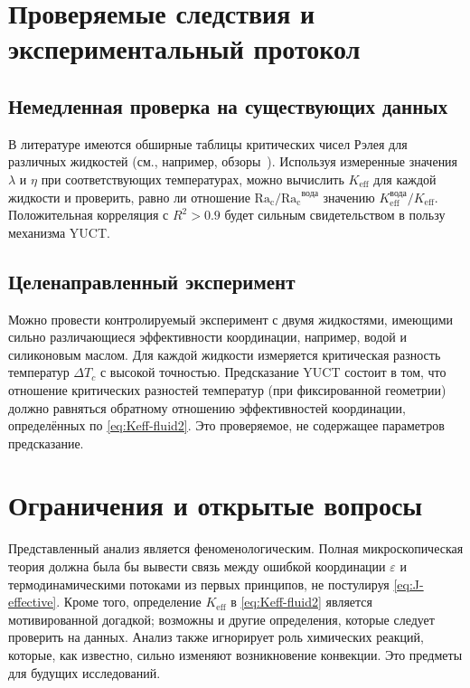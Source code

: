 \documentclass[12pt,a4paper]{article}
\begin{document}
	\section{Проверяемые следствия и экспериментальный протокол}
	
	\subsection{Немедленная проверка на существующих данных}
	В литературе имеются обширные таблицы критических чисел Рэлея для различных жидкостей (см., например, обзоры~\cite{Chandrasekhar1961, Cross1993}). Используя измеренные значения \(\lambda\) и \(\eta\) при соответствующих температурах, можно вычислить \(K_{\mathrm{eff}}\) для каждой жидкости и проверить, равно ли отношение \(\mathrm{Ra_c}/\mathrm{Ra_c}^{\text{вода}}\) значению \(K_{\mathrm{eff}}^{\text{вода}} / K_{\mathrm{eff}}\). Положительная корреляция с \(R^2 > 0.9\) будет сильным свидетельством в пользу механизма YUCT.
	
	\subsection{Целенаправленный эксперимент}
	Можно провести контролируемый эксперимент с двумя жидкостями, имеющими сильно различающиеся эффективности координации, например, водой и силиконовым маслом. Для каждой жидкости измеряется критическая разность температур \(\Delta T_c\) с высокой точностью. Предсказание YUCT состоит в том, что отношение критических разностей температур (при фиксированной геометрии) должно равняться обратному отношению эффективностей координации, определённых по \eqref{eq:Keff-fluid2}. Это проверяемое, не содержащее параметров предсказание.
	
	\section{Ограничения и открытые вопросы}
	
	Представленный анализ является феноменологическим. Полная микроскопическая теория должна была бы вывести связь между ошибкой координации \(\varepsilon\) и термодинамическими потоками из первых принципов, не постулируя \eqref{eq:J-effective}. Кроме того, определение \(K_{\mathrm{eff}}\) в \eqref{eq:Keff-fluid2} является мотивированной догадкой; возможны и другие определения, которые следует проверить на данных. Анализ также игнорирует роль химических реакций, которые, как известно, сильно изменяют возникновение конвекции. Это предметы для будущих исследований.
	
\end{document}
